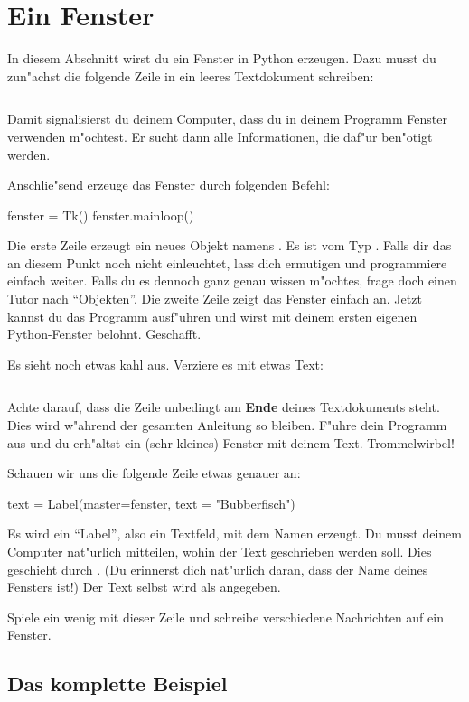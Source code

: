 \documentclass{\VorlagenPfad/coderdojokatext}
\begin{document}
\section{Ein Fenster}
In diesem Abschnitt wirst du ein Fenster in Python erzeugen. Dazu musst du zun"achst die folgende Zeile in ein leeres Textdokument schreiben:

\inputminted[linenos,firstline=1,lastline=1]{python}{../../../Beispiele/fenster_beispiel.py}

Damit signalisierst du deinem Computer, dass du in deinem Programm Fenster verwenden m"ochtest. Er sucht dann alle Informationen, die daf"ur ben"otigt werden.\par
Anschlie"send erzeuge das Fenster durch folgenden Befehl:

\begin{pythoncode}
fenster = Tk()
fenster.mainloop()
\end{pythoncode}
	
Die erste Zeile erzeugt ein neues Objekt namens . Es ist vom Typ . Falls dir das an diesem Punkt noch nicht einleuchtet, lass dich ermutigen und programmiere einfach weiter. Falls du es dennoch ganz genau wissen m"ochtes, frage doch einen Tutor nach "`Objekten"'.
Die zweite Zeile zeigt das Fenster einfach an.
Jetzt kannst du das Programm ausf"uhren und wirst mit deinem ersten eigenen Python-Fenster belohnt. Geschafft.\par
Es sieht noch etwas kahl aus. Verziere es mit etwas Text:

\inputminted[linenos,firstline=5,lastline=6]{python}{../../../Beispiele/fenster_beispiel.py}

Achte darauf, dass die Zeile  unbedingt am \textbf{Ende} deines Textdokuments steht. Dies wird w"ahrend der gesamten Anleitung so bleiben. F"uhre dein Programm aus und du erh"altst ein (sehr kleines) Fenster mit deinem Text. Trommelwirbel!\par
Schauen wir uns die folgende Zeile etwas genauer an:
\begin{pythoncode}
text = Label(master=fenster, text = "Bubberfisch")
\end{pythoncode}
Es wird ein "`Label"', also ein Textfeld, mit dem Namen  erzeugt. Du musst deinem Computer nat"urlich mitteilen, wohin der Text geschrieben werden soll. Dies geschieht durch . (Du erinnerst dich nat"urlich daran, dass  der Name deines Fensters ist!) Der Text selbst wird als  angegeben.\par
Spiele ein wenig mit dieser Zeile und schreibe verschiedene Nachrichten auf ein Fenster.

\subsection{Das komplette Beispiel}

\inputminted[linenos]{python}{../../../Beispiele/fenster_beispiel.py}
\end{document}
